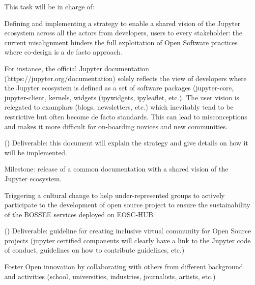 \begin{task}[
  title=Training Workshops and community building,
  id=workshops,
  lead=UIO,
  PM=36,
  wphases={0-48},
  partners={UIO,SRL,XFEL,QS,CDS,WTT,SIL,UPSUD,INSERM}
]
This task will be in charge of:

 
  \begin{compactitem}

   \item Defining and implementing a strategy to enable a shared vision of the Jupyter ecosystem across all the actors from developers, users to every stakeholder: the current misalignment hinders the full exploitation of Open Software practices where co-design is a de facto approach.

For instance, the official Jupyter documentation (https://jupyter.org/documentation) solely reflects the view of developers where the Jupyter ecosystem is defined as a set of software packages (jupyter-core, jupyter-client, kernels, widgets (ipywidgets, ipyleaflet, etc.). The user vision is relegated to examplars (blogs, newsletters, etc.) which inevitably tend to be restrictive but often become de facto standards. This can lead to misconceptions and makes it more difficult for on-boarding novices and new communities.

 

    ()
Deliverable: this document will explain the strategy and give details on how it will be implemented.

Milestone: release of a common documentation with a shared vision of the Jupyter ecosystem.

 

\item Triggering a cultural change to help under-represented groups to actively participate to the development of open source project to ensure the sustainability of the BOSSEE services deployed on EOSC-HUB. 
 

    ()
Deliverable: guideline for creating inclusive virtual community for Open Source projects (jupyter certified components will clearly have a link to the Jupyter code of conduct, guidelines on how to contribute guidelines, etc.)

 

\item Foster Open innovation by collaborating with others from different background and activities (school, universities, industries, journalists, artists, etc.)


\end{compactitem}
\end{task}
